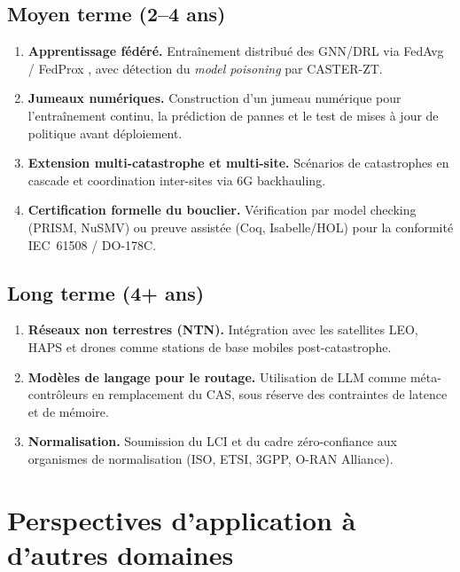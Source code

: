 \subsection{Moyen terme (2--4 ans)}

\begin{enumerate}[resume]
    \item \textbf{Apprentissage fédéré.} Entraînement distribué des GNN/DRL via FedAvg \cite{McMahan2017FedAvg} / FedProx \cite{Li2020FedProx}, avec détection du \emph{model poisoning} par CASTER-ZT.
    \item \textbf{Jumeaux numériques.} Construction d'un jumeau numérique \cite{Nguyen2024DTORAN} pour l'entraînement continu, la prédiction de pannes et le test de mises à jour de politique avant déploiement.
    \item \textbf{Extension multi-catastrophe et multi-site.} Scénarios de catastrophes en cascade et coordination inter-sites via 6G backhauling.
    \item \textbf{Certification formelle du bouclier.} Vérification par model checking (PRISM, NuSMV) ou preuve assistée (Coq, Isabelle/HOL) pour la conformité IEC~61508 / DO-178C.
\end{enumerate}

\subsection{Long terme (4+ ans)}

\begin{enumerate}[resume]
    \item \textbf{Réseaux non terrestres (NTN).} Intégration avec les satellites LEO, HAPS et drones comme stations de base mobiles post-catastrophe.
    \item \textbf{Modèles de langage pour le routage.} Utilisation de LLM comme méta-contrôleurs en remplacement du CAS, sous réserve des contraintes de latence et de mémoire.
    \item \textbf{Normalisation.} Soumission du LCI et du cadre zéro-confiance aux organismes de normalisation (ISO, ETSI, 3GPP, O-RAN Alliance).
\end{enumerate}


\section{Perspectives d'application à d'autres domaines}\label{sec:concl-transferabilite}

